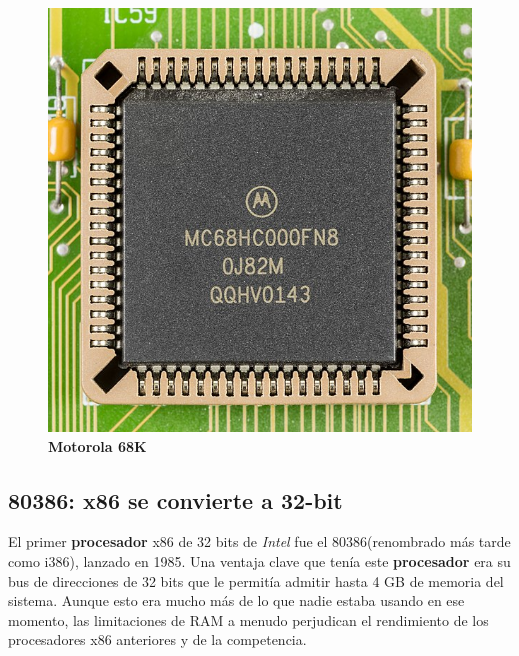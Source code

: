 \begin{figure}[htb]
	\centering
	\includegraphics[scale = 0.15]{Graphics/Motorola_MC68HC000FN8-0695.jpg}
	\caption{\textbf{Motorola 68K}}
	\label{fig:17}
\end{figure}

\subsection{80386: x86 se convierte a 32-bit}
El primer \textbf{procesador} x86 de 32 bits de \emph{Intel} fue el 80386(renombrado más tarde como i386), lanzado en 1985. Una ventaja clave que tenía este \textbf{procesador} era su bus de 
direcciones de 32 bits que le permitía admitir hasta 4 GB de memoria del sistema. Aunque esto era mucho más de lo que nadie estaba 
usando en ese momento, las limitaciones de RAM a menudo perjudican el rendimiento de los procesadores x86 anteriores y de la competencia.


